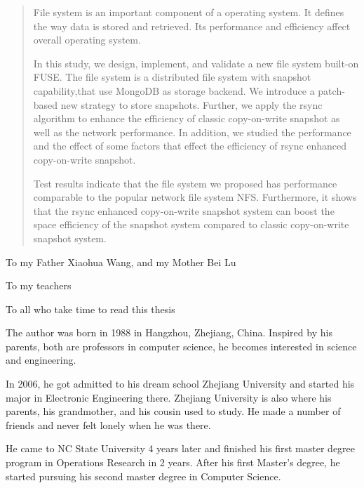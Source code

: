 \begin{abstract}

File system is an important component of a operating system. It defines the way data is stored and retrieved. Its performance and efficiency affect overall operating system.

In this study, we design, implement, and validate a new file system built-on FUSE. The file system is a distributed file system with snapshot capability,that use MongoDB as storage backend. We introduce a patch-based new strategy to store snapshots. Further, we apply the rsync algorithm to enhance the efficiency of classic copy-on-write snapshot as well as the network performance. In addition, we studied the performance and the effect of some factors that effect the efficiency of rsync enhanced copy-on-write snapshot.

Test results indicate that the file system we proposed has performance comparable to the popular network file system NFS. Furthermore, it shows that the rsync enhanced copy-on-write snapshot system can boost the space efficiency of the snapshot system compared to classic copy-on-write snapshot system. 

\end{abstract}

\makecopyrightpage

\maketitlepage

\begin{dedication}
 \centering To my Father Xiaohua Wang, and my Mother Bei Lu

 \centering To my teachers

 \centering To all who take time to read this thesis
\end{dedication}

\begin{biography}

    The author was born in 1988 in Hangzhou, Zhejiang, China. Inspired by his parents, both are professors in computer science, he becomes interested in science and engineering.

    In 2006, he got admitted to his dream school Zhejiang University and started his major in Electronic Engineering there. Zhejiang University is also where his parents, his grandmother, and his cousin used to study. He made a number of friends and never felt lonely when he was there.

    He came to NC State University 4 years later and finished his first master degree program in Operations Research in 2 years. After his first Master's degree, he started pursuing his second master degree in Computer Science.

\end{biography}

